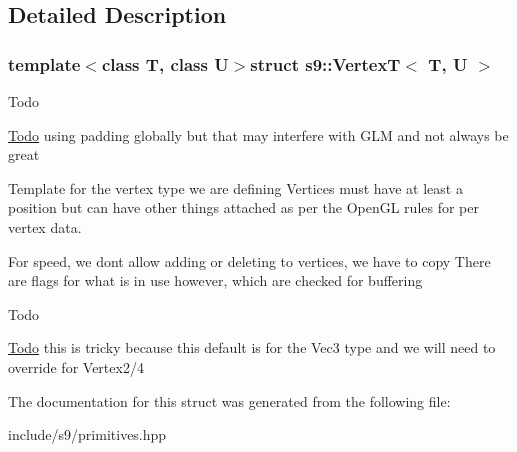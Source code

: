 \subsection{Detailed Description}
\subsubsection*{template$<$class T, class U$>$struct s9\-::\-Vertex\-T$<$ T, U $>$}

\begin{DoxyRefDesc}{Todo}
\item[\hyperlink{todo__todo000038}{Todo}]using padding globally but that may interfere with G\-L\-M and not always be great \end{DoxyRefDesc}
Template for the vertex type we are defining Vertices must have at least a position but can have other things attached as per the Open\-G\-L rules for per vertex data.

For speed, we dont allow adding or deleting to vertices, we have to copy There are flags for what is in use however, which are checked for buffering\begin{DoxyRefDesc}{Todo}
\item[\hyperlink{todo__todo000039}{Todo}]this is tricky because this default is for the Vec3 type and we will need to override for Vertex2/4 \end{DoxyRefDesc}


The documentation for this struct was generated from the following file\-:\begin{DoxyCompactItemize}
\item 
include/s9/primitives.\-hpp\end{DoxyCompactItemize}
